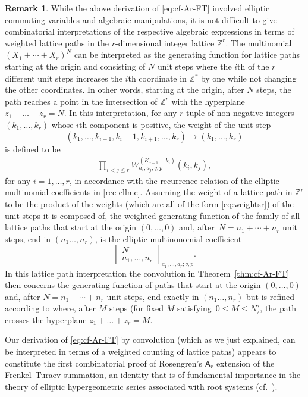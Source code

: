 \documentclass[pdftex]{sigma}
\numberwithin{equation}{section}
\theoremstyle{definition}
\newtheorem{Remark}[Theorem]{Remark}
\begin{document}
\begin{Remark}
While the above derivation of \eqref{eq:cf-Ar-FT}
involved elliptic commuting variables and algebraic manipulations,
it is not difficult to give combinatorial interpretations of the
respective algebraic expressions
in terms of weighted lattice paths in the $r$-dimensional integer lattice
$\mathbb Z^r$. The multinomial $(X_1+\cdots+X_r)^N$
can be interpreted as the generating function for lattice paths
starting at the origin and consisting of $N$ unit steps
where the $i$th of the $r$ different unit steps increases
the $i$th coordinate in $\mathbb Z^r$ by one
while not changing the other coordinates.
In other words, starting at the origin,
after $N$ steps, the path reaches a point in the intersection of
$\mathbb Z^r$ with the hyperplane $z_1+\dots+z_r=N$.
In this interpretation, for any $r$-tuple of non-negative integers
$(k_1,\dots,k_r)$ whose $i$th component is positive,
the weight of the unit step
\[
(k_1,\dots,k_{i-1},k_i-1,k_{i+1},\dots,k_r)\to
(k_1,\dots,k_r)
\]
is defined to be
\begin{gather}\label{eq:weightsr}
 \prod_{i<j\le r}W_{a_i,a_j;q,p}^{(K_{j-1}-k_i)}(k_i,k_j),
\end{gather}
for any $i=1,\dots,r$, in accordance with the recurrence relation of the
elliptic multinomial coefficients in \eqref{rec-ellmc}.
Assuming the weight of a lattice path in $\mathbb Z^r$
to be the product of the weights (which are all of the form
\eqref{eq:weightsr}) of the unit steps it is composed of,
the weighted generating function of the family of all lattice paths
that start at the origin $(0,\dots,0)$ and, after~${N=n_1+\cdots+n_r}$ unit steps, end in $(n_1\dots,n_r)$,
is the elliptic multinonomial coefficient
\[
\begin{bmatrix}N\\n_1,\dots,n_r\end{bmatrix}_{a_1,\dots,a_r;q,p}.
\]
In this lattice path interpretation the convolution in
Theorem~\ref{thm:cf-Ar-FT} then concerns the generating function
of paths that start at the origin $(0,\dots,0)$ and, after
$N=n_1+\cdots+n_r$ unit steps, end exactly in $(n_1\dots,n_r)$
but is refined according to where, after $M$ steps (for fixed $M$
satisfying~${0\le M\le N}$), the path crosses the hyperplane
$z_1+\dots+z_r=M$.

Our derivation of \eqref{eq:cf-Ar-FT}
by convolution (which as we just explained, can be interpreted
in terms of a weighted counting of lattice paths) appears to
constitute the first combinatorial proof of Rosengren's
$\mathsf A_r$ extension of the Frenkel--Turaev summation,
an identity that is of fundamental importance in the theory of
elliptic hypergeometric series associated with root
systems (cf.\ \cite{RW}).
\end{Remark}
\end{document}
